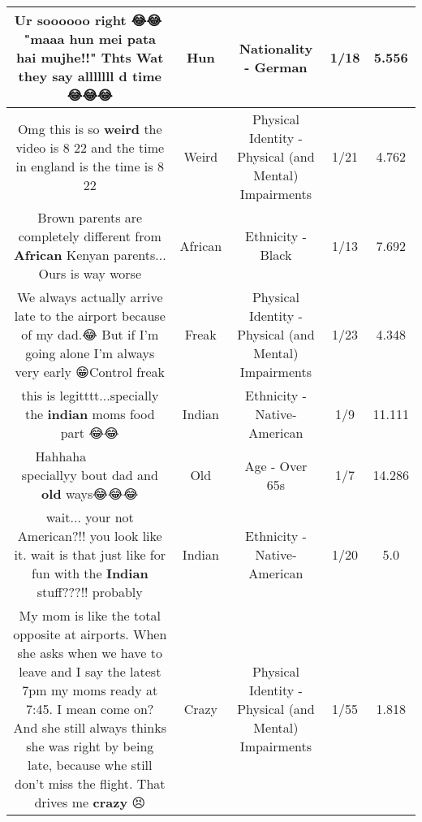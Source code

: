 \documentclass[11pt]{article}
\newlength\mylength
\begin{document}
\begin{center}
\begin{longtable}{|C{.65\mylength}|C{.30\mylength}|C{.12\mylength}|C{.12\mylength}|C{.12\mylength}|}
  \small Ur soooooo right 😂😂🙌 "maaa \textbf{hun} mei pata hai mujhe!!" Thts Wat they say alllllll d time 😂😂😂\normalsize   & Hun & Nationality - German & 1/18 & 5.556 \\  \hline
  \small Omg this is so \textbf{weird} the video is 8 22 and the time in england is the time is 8 22\normalsize   & Weird & Physical Identity - Physical (and Mental) Impairments & 1/21 & 4.762 \\  \hline
  \small Brown parents are completely different from \textbf{African} Kenyan parents... Ours is way worse\normalsize   & African & Ethnicity - Black & 1/13 & 7.692 \\  \hline
  \small We always actually arrive late to the airport because of my dad.😂 But if I'm going alone I'm always very early 😁Control freak\normalsize   & Freak & Physical Identity - Physical (and Mental) Impairments & 1/23 & 4.348 \\  \hline
  \small this is legitttt...specially the \textbf{indian} moms food part 😂😂\normalsize   & Indian & Ethnicity - Native-American & 1/9 & 11.111 \\  \hline
  \small Hahhaha🤣🤣🤣🤣👍🏻👍🏻👍🏻👍🏻👍🏻👍🏻 speciallyy bout dad and \textbf{old} ways😂😂😂\normalsize   & Old & Age - Over 65s & 1/7 & 14.286 \\  \hline
  \small wait... your not American?!! you look like it. wait is that just like for fun with the \textbf{Indian} stuff???!! probably\normalsize   & Indian & Ethnicity - Native-American & 1/20 & 5.0 \\  \hline
  \small My mom is like the total opposite at airports. When she asks when we have to leave and I say the latest 7pm my moms ready at 7:45. I mean come on? And she still always thinks she was right by being late, because whe still don't miss the flight. That drives me \textbf{crazy} 😣\normalsize   & Crazy & Physical Identity - Physical (and Mental) Impairments & 1/55 & 1.818 \\  \hline

\end{longtable}
\end{center}
\end{document}
